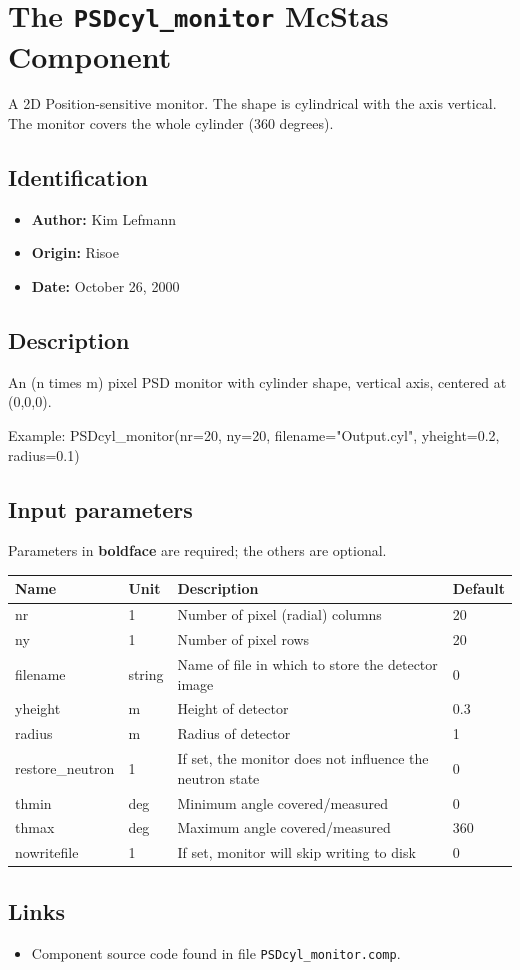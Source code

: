 \section{The \texttt{PSDcyl\_monitor} McStas Component}
A 2D Position-sensitive monitor. The shape is cylindrical with
the axis vertical. The monitor covers the whole cylinder (360 degrees).

\subsection*{Identification}
\begin{itemize}
  \item \textbf{Author:} Kim Lefmann
  \item \textbf{Origin:} Risoe
  \item \textbf{Date:} October 26, 2000
\end{itemize}

\subsection*{Description}
An (n times m) pixel PSD monitor with cylinder shape, vertical axis, centered at (0,0,0).

Example: PSDcyl\_monitor(nr=20, ny=20, filename="Output.cyl", yheight=0.2, radius=0.1)

\subsection*{Input parameters}
Parameters in \textbf{boldface} are required; the others are optional.

\begin{longtable}{p{}p{}p{}p{}}
\toprule
\textbf{Name} & \textbf{Unit} & \textbf{Description} & \textbf{Default} \\
\midrule
\endhead
nr & 1 & Number of pixel (radial) columns & 20 \\
ny & 1 & Number of pixel rows & 20 \\
filename & string & Name of file in which to store the detector image & 0 \\
yheight & m & Height of detector & 0.3 \\
radius & m & Radius of detector & 1 \\
restore\_neutron & 1 & If set, the monitor does not influence the neutron state & 0 \\
thmin & deg & Minimum angle covered/measured & 0 \\
thmax & deg & Maximum angle covered/measured & 360 \\
nowritefile & 1 & If set, monitor will skip writing to disk & 0 \\
\bottomrule
\end{longtable}

\subsection*{Links}
\begin{itemize}
  \item Component source code found in file \texttt{PSDcyl\_monitor.comp}.
\end{itemize}
